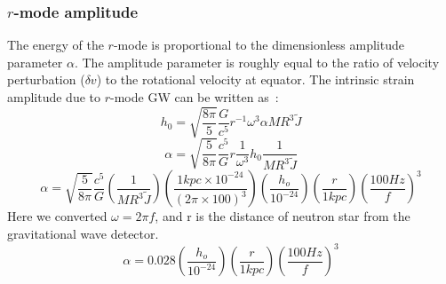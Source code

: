 \documentclass{ttuthes2007}
\begin{document}
\subsubsection{$r$-mode amplitude}
The energy of the $r$-mode is proportional to the dimensionless amplitude
parameter $\alpha$. The amplitude parameter is roughly equal to the ratio of
velocity perturbation ($\delta v$) to the rotational velocity at equator. The
intrinsic strain amplitude due to $r$-mode \ac{GW} can be written
as~\cite{Owen:2010ng}:
\begin{equation*}                                                               
h_0 =\sqrt{\frac{8\pi}{5}}\frac{G}{c^5}r^{-1}\omega^3 \alpha M R^3 \tilde{J}      
\end{equation*}                                                                 
\begin{equation*}                                                               
\alpha = \sqrt{\frac{5}{8\pi}}\frac{c^5}{G} r \frac{1}{\omega^3} h_0 \frac{1}{M   
R^3 \tilde{J}}                                                                  
\end{equation*}                                                                 
\begin{equation*}                                                               
\alpha=\sqrt{\frac{5}{8\pi}}\frac{c^5}{G}\left(\frac{1}{M                       
R^3 \tilde{J}}\right)\left(\frac{1kpc\times 10^{-24}}{(2\pi \times
100)^3}\right)
\left(\frac{h_o}{10^{-24}}\right)\left(\frac{r}{1kpc}\right)\left(\frac{100Hz}{f}\right)^3
\end{equation*}                                                                 
Here we converted $\omega=2\pi f$, and r is the distance of neutron star from
the gravitational wave detector.                          
\begin{equation} 
\alpha =0.028\left(\frac{h_o}{10^{-24}}\right)\left(\frac{r}{1kpc}\right)\left(\frac{100Hz}{f}\right)^3
\end{equation}           
\end{document}
